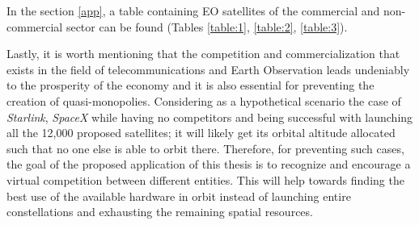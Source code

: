 \begin{center}
\begin{adjustbox}{width=0.9\textwidth}
\begin{tabular}{||c| c |c |c |c||}


\hline
\end{tabular}
\label{table:EO}
\end{adjustbox}
\end{center}
\bigskip

\normalsize

In the section \ref{app}, a table containing EO satellites of the commercial and non-commercial sector can be found (Tables \ref{table:1}, \ref{table:2}, \ref{table:3}).

Lastly, it is worth mentioning that the competition and commercialization that exists in the field of telecommunications and Earth Observation leads undeniably to the prosperity of the economy and it is also essential for preventing the creation of quasi-monopolies. Considering as a hypothetical scenario the case of \textit{Starlink}, \textit{SpaceX} while having no competitors and being successful with launching all the 12,000 proposed satellites; it will likely get its orbital altitude allocated such that no one else is able to orbit there. Therefore, for preventing such cases, the goal of the proposed application of this thesis is to recognize and encourage a virtual competition between different entities. This will help towards finding the best use of the available hardware in orbit instead of launching entire constellations and exhausting the remaining spatial resources.


